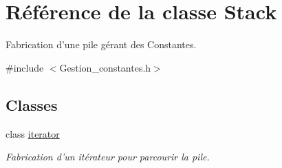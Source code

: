 \hypertarget{class_stack}{\section{Référence de la classe Stack}
\label{class_stack}
}


Fabrication d'une pile gérant des Constantes.  




{\ttfamily \#include $<$Gestion\-\_\-constantes.\-h$>$}

\subsection*{Classes}
\begin{DoxyCompactItemize}
\item 
class \hyperlink{class_stack_1_1iterator}{iterator}
\begin{DoxyCompactList}\small\item\em Fabrication d'un itérateur pour parcourir la pile. \end{DoxyCompactList}\end{DoxyCompactItemize}
